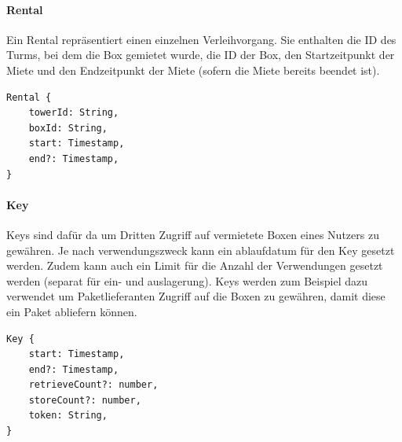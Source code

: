 \paragraph{Rental}
Ein Rental repräsentiert einen einzelnen Verleihvorgang. Sie enthalten die ID des Turms, bei dem die Box gemietet wurde, die ID der Box, den Startzeitpunkt der Miete und den Endzeitpunkt der Miete (sofern die Miete bereits beendet ist).

\begin{verbatim}
Rental {
    towerId: String,
    boxId: String,
    start: Timestamp,
    end?: Timestamp,
}
\end{verbatim}


\paragraph{Key}
Keys sind dafür da um Dritten Zugriff auf vermietete Boxen eines Nutzers zu gewähren. Je nach verwendungszweck kann ein ablaufdatum für den Key gesetzt werden. Zudem kann auch ein Limit für die Anzahl der Verwendungen gesetzt werden (separat für ein- und auslagerung). Keys werden zum Beispiel dazu verwendet um Paketlieferanten Zugriff auf die Boxen zu gewähren, damit diese ein Paket abliefern können.

\begin{verbatim}
Key {
    start: Timestamp,
    end?: Timestamp,
    retrieveCount?: number,
    storeCount?: number,
    token: String,
}
\end{verbatim}